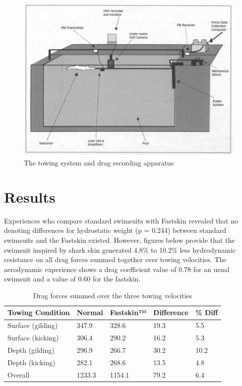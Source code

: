 \documentclass[twoside,twocolumn]{article}                          %
\begin{document}
\begin{figure}[!h]
\begin{center}
  \includegraphics[scale=0.3]{fig2.JPG}
\end{center}
\caption{The towing system and drag recording apparatus}
\end{figure}

\section{Results}
Experiences who compare standard swimsuits with Fastskin revealed that no denoting differences for hydrostatic weight (p = 0.244) between standard swimsuits and the Fastskin existed. However, figures below provide that the swimsuit inspired by shark skin generated 4.8\% to 10.2\% less hydrodynamic resistance on all drag forces summed together over towing velocities. The aerodynamic experience shows a drag coefficient value of 0.78 for an usual swimsuit and a value of 0.60 for the fastskin. 

\begin{center}
\begin{table}[!h]
  \begin{tabular}{ m{35px} m{35px} m{35px} m{35px} m{35px} }
    
    \hline
    Towing Condition & Normal & Fastskin™ & Difference & \% Diff
    \tabularnewline

    \hline
    Surface (gilding) & 347.9 & 328.6 & 19.3 & 5.5
    \tabularnewline

    \hline
    Surface (kicking) & 306.4 & 290.2 & 16.2 & 5.3
    \tabularnewline

    \hline
    Depth (gilding) & 296.9 & 266.7 & 30.2 & 10.2
    \tabularnewline

    \hline
    Depth (kicking) & 282.1 & 268.6 & 13.5 & 4.8
    \tabularnewline

    \hline
    Overall & 1233.3 & 1154.1 & 79.2 & 6.4
    \tabularnewline
    \hline
  \end{tabular}
  \caption{ Drag forces summed over the three towing velocities}
  \vspace{-8mm}
\end{table}
\end{center}
\end{document}
